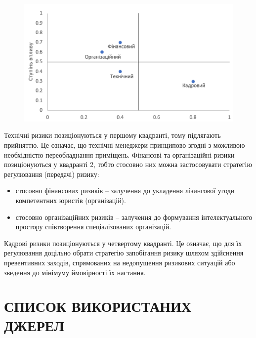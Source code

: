 \documentclass[oneside,14pt]{extarticle}
\begin{document}
\begin{figure}[H]
	\centering
	\includegraphics[width=\textwidth]{1}
\end{figure}

Технічні ризики позиціонуються у першому квадранті, тому підлягають
прийняттю. Це означає, що технічні менеджери принципово згодні з можливою
необхідністю переобладнання приміщень.
Фінансові та організаційні ризики позиціонуються у квадранті 2, тобто
стосовно них можна застосовувати стратегію регулювання (передачі) ризику:

\begin{itemize}
	\item стосовно фінансових ризиків – залучення до укладення лізингової
	угоди компетентних юристів (організацій).
	\item стосовно організаційних ризиків – залучення до формування
	інтелектуального простору співтворення спеціалізованих організацій.
\end{itemize} 

Кадрові ризики позиціонуються у четвертому квадранті. Це означає, що для
їх регулювання доцільно обрати стратегію запобігання ризику шляхом здійснення
превентивних заходів, спрямованих на недопущення ризикових ситуацій або
зведення до мінімуму ймовірності їх настання.

\newpage
\section*{СПИСОК ВИКОРИСТАНИХ ДЖЕРЕЛ}
\end{document}
